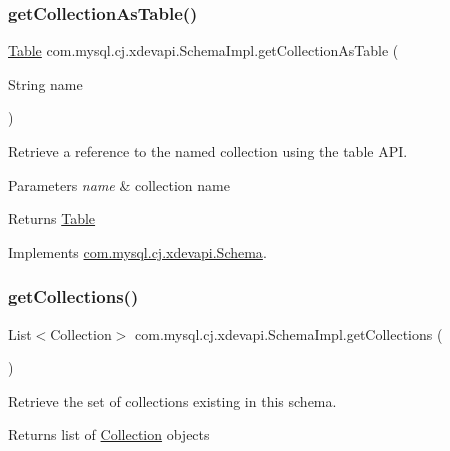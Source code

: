 \subsubsection{\texorpdfstring{get\+Collection\+As\+Table()}{getCollectionAsTable()}}
{\footnotesize\ttfamily \mbox{\hyperlink{interfacecom_1_1mysql_1_1cj_1_1xdevapi_1_1_table}{Table}} com.\+mysql.\+cj.\+xdevapi.\+Schema\+Impl.\+get\+Collection\+As\+Table (\begin{DoxyParamCaption}\item[{String}]{name }\end{DoxyParamCaption})}

Retrieve a reference to the named collection using the table A\+PI.


\begin{DoxyParams}{Parameters}
{\em name} & collection name \\
\hline
\end{DoxyParams}
\begin{DoxyReturn}{Returns}
\mbox{\hyperlink{interfacecom_1_1mysql_1_1cj_1_1xdevapi_1_1_table}{Table}} 
\end{DoxyReturn}


Implements \mbox{\hyperlink{interfacecom_1_1mysql_1_1cj_1_1xdevapi_1_1_schema_adaa1920ec971a87acc1173ba0c56f92e}{com.\+mysql.\+cj.\+xdevapi.\+Schema}}.

\mbox{\label{classcom_1_1mysql_1_1cj_1_1xdevapi_1_1_schema_impl_a67c63b711c361bf306149d53d1149e61}} 
\subsubsection{\texorpdfstring{get\+Collections()}{getCollections()}\hspace{0.1cm}{\footnotesize\ttfamily [1/2]}}
{\footnotesize\ttfamily List$<$Collection$>$ com.\+mysql.\+cj.\+xdevapi.\+Schema\+Impl.\+get\+Collections (\begin{DoxyParamCaption}{ }\end{DoxyParamCaption})}

Retrieve the set of collections existing in this schema.

\begin{DoxyReturn}{Returns}
list of \mbox{\hyperlink{interfacecom_1_1mysql_1_1cj_1_1xdevapi_1_1_collection}{Collection}} objects 
\end{DoxyReturn}


